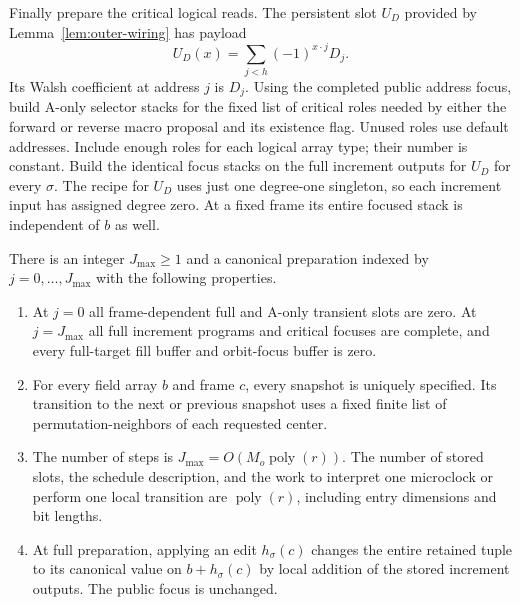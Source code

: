 Finally prepare the critical logical reads. The persistent slot $U_D$
provided by Lemma~\ref{lem:outer-wiring} has payload
\[
 U_D(x)=\sum_{j<h}(-1)^{x\cdot j}D_j.
\]
Its Walsh coefficient at address $j$ is $D_j$. Using the completed public
address focus, build A-only selector stacks for the fixed list of
critical roles needed by either the forward or reverse macro proposal
and its existence flag. Unused roles use default addresses. Include
enough roles for each logical array type; their number is constant.
Build the identical focus stacks on the full increment outputs for
$U_D$ for every $\sigma$. The recipe for $U_D$ uses just one degree-one
singleton, so each increment input has assigned degree zero. At a fixed
frame its entire focused stack is independent of $b$ as well.

\begin{lemma}\label{oe:preparation}
There is an integer $J_{\max}\geq1$ and a canonical preparation indexed by
$j=0,\ldots,J_{\max}$ with the following properties.
\begin{enumerate}[label=\textup{(\roman*)}]
\item At $j=0$ all frame-dependent full and A-only transient slots are
zero. At $j=J_{\max}$ all full increment programs and critical focuses are
complete, and every full-target fill buffer and orbit-focus buffer is
zero.
\item For every field array $b$ and frame $c$, every snapshot is uniquely
specified. Its transition to the next or previous snapshot uses a fixed
finite list of permutation-neighbors of each requested center.
\item The number of steps is $J_{\max}=O(M_o\operatorname{poly}(r))$.
The number of stored slots, the schedule description, and the work to
interpret one microclock or perform one local transition are
$\operatorname{poly}(r)$, including entry dimensions and bit lengths.
\item At full preparation, applying an edit $h_\sigma(c)$ changes the
entire retained tuple to its canonical value on $b+h_\sigma(c)$ by local
addition of the stored increment outputs. The public focus is unchanged.
\end{enumerate}
\end{lemma}

